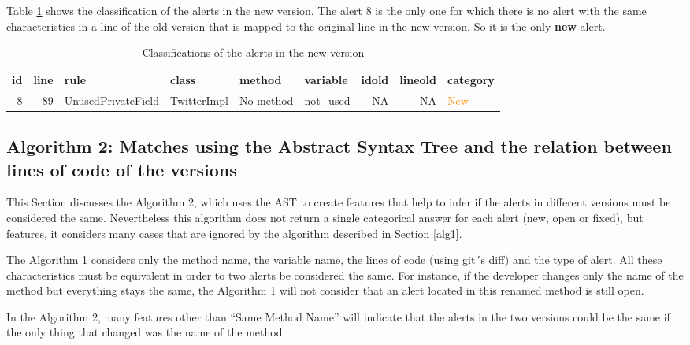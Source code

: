 \documentclass[
]{article}
\begin{document}
\normalsize

Table \ref{class_new} shows the classification of the alerts in the new
version. The alert 8 is the only one for which there is no alert with
the same characteristics in a line of the old version that is mapped to
the original line in the new version. So it is the only \textbf{new}
alert.

\small

\begin{table}[!h]

\caption{\label{tab:unnamed-chunk-3}Classifications of the alerts in the new version \label{class_new}}
\centering
\fontsize{6}{8}\selectfont
\begin{tabular}[t]{rrllllrrl}
\toprule
id & line & rule & class & method & variable & idold & lineold & category\\
\midrule
\rowcolor{gray!6}  8 & 89 & UnusedPrivateField & TwitterImpl & No method & not\_used & NA & NA & \textcolor{darkorange}{New}\\
\bottomrule
\end{tabular}
\end{table}

\normalsize

\subsection{Algorithm 2: Matches using the Abstract Syntax Tree and the relation between lines of code of the versions}\label{alg2}

This Section discusses the Algorithm 2, which uses the AST to create
features that help to infer if the alerts in different versions must be
considered the same. Nevertheless this algorithm does not return a
single categorical answer for each alert (new, open or fixed), but
features, it considers many cases that are ignored by the algorithm
described in Section \ref{alg1}.

The Algorithm 1 considers only the method name, the variable name, the
lines of code (using git´s diff) and the type of alert. All these
characteristics must be equivalent in order to two alerts be considered
the same. For instance, if the developer changes only the name of the
method but everything stays the same, the Algorithm 1 will not consider
that an alert located in this renamed method is still open.

In the Algorithm 2, many features other than ``Same Method Name'' will
indicate that the alerts in the two versions could be the same if the
only thing that changed was the name of the method.
\end{document}
